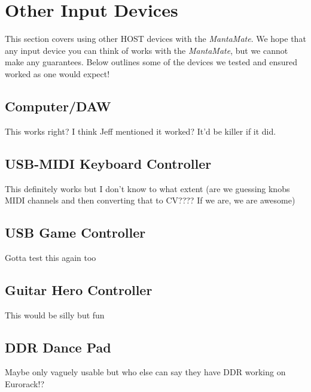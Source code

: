 \renewcommand{\chaptername}{Section}
\chapter{Other Input Devices}

\begin{intro}
  This section covers using other HOST devices with the \emph{MantaMate}. We hope
  that  any input device you can think of works with the \emph{MantaMate}, but we
  cannot make any guarantees. Below outlines some of the devices we tested and ensured
  worked as one would expect!
\end{intro}

\section{Computer/DAW}
  This works right? I think Jeff mentioned it worked? It'd be killer if it did.

\section{USB-MIDI Keyboard Controller}
  This definitely works but I don't know to what extent (are we guessing knobs
  MIDI channels and then converting that to CV???? If we are, we are awesome)

\section{USB Game Controller}
  Gotta test this again too

\section{Guitar Hero Controller}
  This would be silly but fun

\section{DDR Dance Pad}
  Maybe only vaguely usable but who else can say they have DDR working on Eurorack!?


